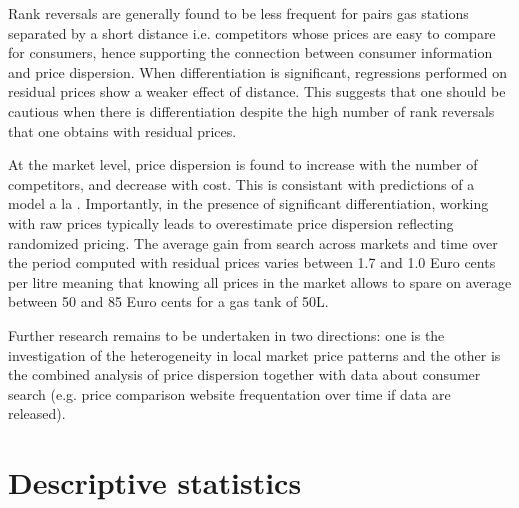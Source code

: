 \documentclass[english]{article}
\begin{document}
{{Rank reversals are generally found to be less frequent for pairs gas stations separated by a short distance i.e. competitors whose prices are easy to compare for consumers, hence supporting the connection between consumer information and price dispersion. When differentiation is significant, regressions performed on residual prices show a weaker effect of distance. This suggests that one should be cautious when there is differentiation despite the high number of rank reversals that one obtains with residual prices.

At the market level, price dispersion is found to increase with the number of competitors, and decrease with cost. This is consistant with predictions of a model a la \cite{VAR80}. Importantly, in the presence of significant differentiation, working with raw prices typically leads to overestimate price dispersion reflecting randomized pricing. The average gain from search across markets and time over the period computed with residual prices varies between 1.7 and 1.0 Euro cents per litre meaning that knowing all prices in the market allows to spare on average between 50 and 85 Euro cents for a gas tank of 50L.

Further research remains to be undertaken in two directions: one is the investigation of the heterogeneity in local market price patterns and the other is the combined analysis of price dispersion together with data about consumer search (e.g. price comparison website frequentation over time if data are released).

\newpage



\newpage

\appendix

\section{Descriptive statistics}

}}
\end{document}
